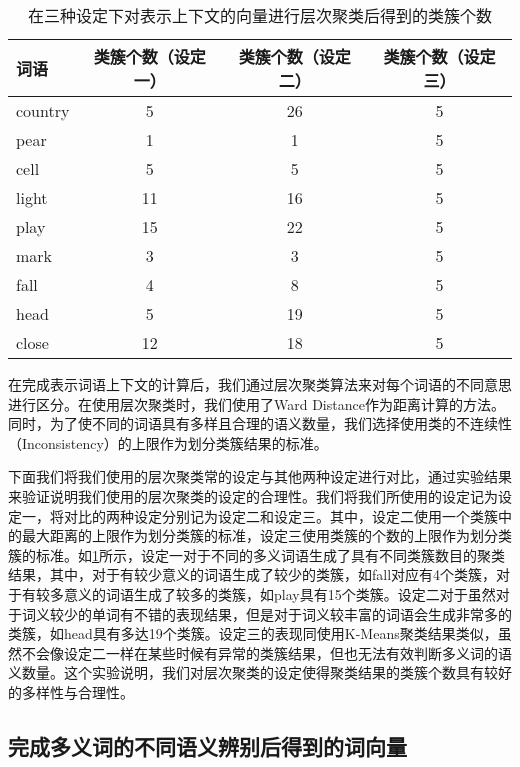 \begin{longtable}{lccc}
\caption[在三种不同的设定下层次聚类所得到的类簇个数]{在三种设定下对表示上下文的向量进行层次聚类后得到的类簇个数}
\label{tab:num4hc} \\
\toprule[1.5pt]
词语 & 类簇个数（设定一） & 类簇个数（设定二） & 类簇个数（设定三） \\
\midrule[1pt]
country	&	5	&	26	&	5	\\
pear	&	1	&	1	& 	5	\\
cell	&	5	&	5	&	5	\\
light	&	11	&	16	&	5	\\
play	&	15	&	22	&	5	\\
mark	&	3	&	3	&	5	\\
fall	&	4	&	8	&	5	\\
head	&	5	&	19	&	5	\\
close	&	12	&	18	&	5	\\
\endfirsthead
\end{longtable}

在完成表示词语上下文的计算后，我们通过层次聚类算法来对每个词语的不同意思进行区分。在使用层次聚类时，我们使用了Ward Distance\cite{ward1963hierarchical}作为距离计算的方法。同时，为了使不同的词语具有多样且合理的语义数量，我们选择使用类的不连续性（Inconsistency）的上限作为划分类簇结果的标准。

下面我们将我们使用的层次聚类常的设定与其他两种设定进行对比，通过实验结果来验证说明我们使用的层次聚类的设定的合理性。我们将我们所使用的设定记为设定一，将对比的两种设定分别记为设定二和设定三。其中，设定二使用一个类簇中的最大距离的上限作为划分类簇的标准，设定三使用类簇的个数的上限作为划分类簇的标准。如\ref{tab:num4hc}所示，设定一对于不同的多义词语生成了具有不同类簇数目的聚类结果，其中，对于有较少意义的词语生成了较少的类簇，如fall对应有4个类簇，对于有较多意义的词语生成了较多的类簇，如play具有15个类簇。设定二对于虽然对于词义较少的单词有不错的表现结果，但是对于词义较丰富的词语会生成非常多的类簇，如head具有多达19个类簇。设定三的表现同使用K-Means聚类结果类似，虽然不会像设定二一样在某些时候有异常的类簇结果，但也无法有效判断多义词的语义数量。这个实验说明，我们对层次聚类的设定使得聚类结果的类簇个数具有较好的多样性与合理性。

\subsection{完成多义词的不同语义辨别后得到的词向量}

